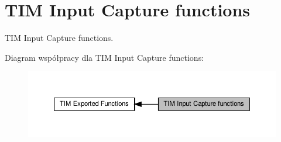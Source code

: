 \hypertarget{group___t_i_m___exported___functions___group4}{}\section{T\+IM Input Capture functions}
\label{group___t_i_m___exported___functions___group4}


T\+IM Input Capture functions.  


Diagram współpracy dla T\+IM Input Capture functions\+:\nopagebreak
\begin{figure}[H]
\begin{center}
\leavevmode
\includegraphics[width=350pt]{group___t_i_m___exported___functions___group4}
\end{center}
\end{figure}
